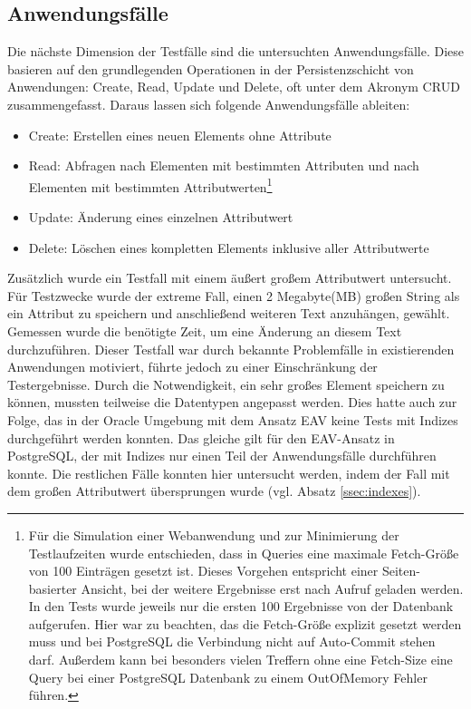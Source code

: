 \subsection{Anwendungsfälle}

Die nächste Dimension der Testfälle sind die untersuchten Anwendungsfälle. Diese basieren auf den grundlegenden Operationen in der Persistenzschicht von Anwendungen: Create, Read, Update und Delete, oft unter dem Akronym CRUD zusammengefasst. Daraus lassen sich folgende Anwendungsfälle ableiten:

\begin{itemize}
\item Create: Erstellen eines neuen Elements ohne Attribute
\item Read: Abfragen nach Elementen mit bestimmten Attributen und nach Elementen mit bestimmten Attributwerten\footnote{Für die Simulation einer Webanwendung und zur Minimierung der Testlaufzeiten wurde entschieden, dass in Queries eine maximale Fetch-Größe von 100 Einträgen gesetzt ist. Dieses Vorgehen entspricht einer Seiten-basierter Ansicht, bei der weitere Ergebnisse erst nach Aufruf geladen werden. In den Tests wurde jeweils nur die ersten 100 Ergebnisse von der Datenbank aufgerufen. Hier war zu beachten, das die Fetch-Größe explizit gesetzt werden muss und bei PostgreSQL die Verbindung nicht auf Auto-Commit stehen darf. Außerdem kann bei besonders vielen Treffern ohne eine Fetch-Size eine Query bei einer PostgreSQL Datenbank zu einem OutOfMemory Fehler führen.}
\item Update: Änderung eines einzelnen Attributwert
\item Delete: Löschen eines kompletten Elements inklusive aller Attributwerte
\end{itemize}

Zusätzlich wurde ein Testfall mit einem äußert großem Attributwert untersucht. Für Testzwecke wurde der extreme Fall, einen 2 Megabyte(MB) großen String als ein Attribut zu speichern und anschließend weiteren Text anzuhängen, gewählt. Gemessen wurde die benötigte Zeit, um eine Änderung an diesem Text durchzuführen. Dieser Testfall war durch bekannte Problemfälle in existierenden Anwendungen motiviert, führte jedoch zu einer Einschränkung der Testergebnisse. Durch die Notwendigkeit, ein sehr großes Element speichern zu können, mussten teilweise die Datentypen angepasst werden. Dies hatte auch zur Folge, das in der Oracle Umgebung mit dem Ansatz EAV keine Tests mit Indizes durchgeführt werden konnten. Das gleiche gilt für den EAV-Ansatz in PostgreSQL, der mit Indizes nur einen Teil der Anwendungsfälle durchführen konnte. Die restlichen Fälle konnten hier untersucht werden, indem der Fall mit dem großen Attributwert übersprungen wurde (vgl. Absatz \ref{ssec:indexes}).

